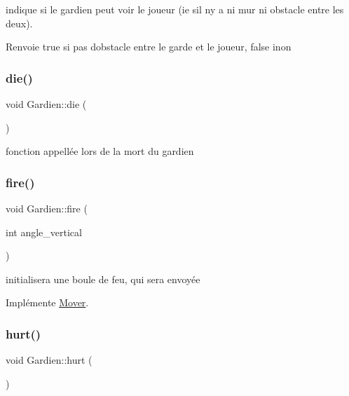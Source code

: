 indique si le gardien peut voir le joueur (ie s\textquotesingle{}il n\textquotesingle{}y a ni mur ni obstacle entre les deux). 

\begin{DoxyReturn}{Renvoie}
true si pas d\textquotesingle{}obstacle entre le garde et le joueur, false inon 
\end{DoxyReturn}
\mbox{\label{classGardien_a17d57e80bce205161c98c557bb6e7a9c}} 
\subsubsection{\texorpdfstring{die()}{die()}}
{\footnotesize\ttfamily void Gardien\+::die (\begin{DoxyParamCaption}{ }\end{DoxyParamCaption})\hspace{0.3cm}{\ttfamily [private]}}



fonction appellée lors de la mort du gardien 

\mbox{\label{classGardien_aa0e2e0fbdca75ddc5e0501b5498d5f55}} 
\subsubsection{\texorpdfstring{fire()}{fire()}}
{\footnotesize\ttfamily void Gardien\+::fire (\begin{DoxyParamCaption}\item[{int}]{angle\+\_\+vertical }\end{DoxyParamCaption})\hspace{0.3cm}{\ttfamily [virtual]}}



initialisera une boule de feu, qui sera envoyée 



Implémente \hyperlink{classMover_a670fb72f8e496de3420b89c84def7418}{Mover}.

\mbox{\label{classGardien_ac4ba490e309de80c1449fc5baef90390}} 
\subsubsection{\texorpdfstring{hurt()}{hurt()}}
{\footnotesize\ttfamily void Gardien\+::hurt (\begin{DoxyParamCaption}{ }\end{DoxyParamCaption})}




